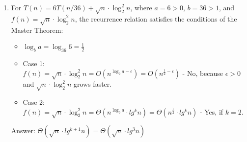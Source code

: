 \documentclass[dvipsnames]{article}
\begin{document}
\begin{enumerate}
\begin{enumerate}
    
\item For $T(n) = 6 T(n / 36) + \sqrt{n} \cdot \log_2^2 n$, where $ a = 6 > 0 $, $ b = 36 > 1 $, and $ f(n) = \sqrt{n} \cdot \log_2^2 n $, the recurrence relation satisfies the conditions of the Master Theorem:
    \begin{itemize}
        \item $ \log_{b} a =\log_{36} 6 = \frac{1}{2} $
        \item Case 1: \\
        \hspace{30mm} $ f(n) = \sqrt{n} \cdot \log_2^2 n= O(n^{\log_{b} a - \epsilon}) = O(n^{\frac{1}{2} - \epsilon}) $ - No, because $ \epsilon > 0 $ and $ \sqrt{n} \cdot \log_2^2 n $ grows faster.
        \item Case 2: \\
        \hspace{30mm} $ f(n) = \sqrt{n} \cdot \log_2^2 n = \Theta(n^{\log_{b} a}\cdot lg^k n) = \Theta(n^{\frac{1}{2}}\cdot lg^k n) $ - Yes, if $k = 2$.
    \end{itemize}
    Answer: $\Theta(\sqrt{n} \cdot lg^{k+1}n) = \Theta(\sqrt{n} \cdot lg^3 n)$



\end{enumerate}
\end{enumerate}
\end{document}
